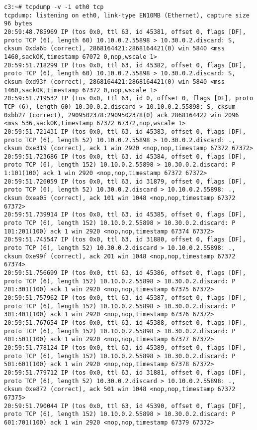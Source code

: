 \documentclass[a4paper,12pt]{article}
\begin{document}
\begin{lstlisting}
c3:~# tcpdump -v -i eth0 tcp
tcpdump: listening on eth0, link-type EN10MB (Ethernet), capture size 96 bytes
20:59:48.785969 IP (tos 0x0, ttl 63, id 45381, offset 0, flags [DF], proto TCP (6), length 60) 10.10.0.2.55898 > 10.30.0.2.discard: S, cksum 0xda6b (correct), 2868164421:2868164421(0) win 5840 <mss 1460,sackOK,timestamp 67072 0,nop,wscale 1>
20:59:51.718299 IP (tos 0x0, ttl 63, id 45382, offset 0, flags [DF], proto TCP (6), length 60) 10.10.0.2.55898 > 10.30.0.2.discard: S, cksum 0xd93f (correct), 2868164421:2868164421(0) win 5840 <mss 1460,sackOK,timestamp 67372 0,nop,wscale 1>
20:59:51.719532 IP (tos 0x0, ttl 63, id 0, offset 0, flags [DF], proto TCP (6), length 60) 10.30.0.2.discard > 10.10.0.2.55898: S, cksum 0xbb27 (correct), 2909502378:2909502378(0) ack 2868164422 win 2096 <mss 536,sackOK,timestamp 67372 67372,nop,wscale 1>
20:59:51.721431 IP (tos 0x0, ttl 63, id 45383, offset 0, flags [DF], proto TCP (6), length 52) 10.10.0.2.55898 > 10.30.0.2.discard: ., cksum 0xe319 (correct), ack 1 win 2920 <nop,nop,timestamp 67372 67372>
20:59:51.723686 IP (tos 0x0, ttl 63, id 45384, offset 0, flags [DF], proto TCP (6), length 152) 10.10.0.2.55898 > 10.30.0.2.discard: P 1:101(100) ack 1 win 2920 <nop,nop,timestamp 67372 67372>
20:59:51.726059 IP (tos 0x0, ttl 63, id 31879, offset 0, flags [DF], proto TCP (6), length 52) 10.30.0.2.discard > 10.10.0.2.55898: ., cksum 0xea05 (correct), ack 101 win 1048 <nop,nop,timestamp 67372 67372>
20:59:51.739914 IP (tos 0x0, ttl 63, id 45385, offset 0, flags [DF], proto TCP (6), length 152) 10.10.0.2.55898 > 10.30.0.2.discard: P 101:201(100) ack 1 win 2920 <nop,nop,timestamp 67374 67372>
20:59:51.745547 IP (tos 0x0, ttl 63, id 31880, offset 0, flags [DF], proto TCP (6), length 52) 10.30.0.2.discard > 10.10.0.2.55898: ., cksum 0xe99f (correct), ack 201 win 1048 <nop,nop,timestamp 67372 67374>
20:59:51.756699 IP (tos 0x0, ttl 63, id 45386, offset 0, flags [DF], proto TCP (6), length 152) 10.10.0.2.55898 > 10.30.0.2.discard: P 201:301(100) ack 1 win 2920 <nop,nop,timestamp 67375 67372>
20:59:51.757962 IP (tos 0x0, ttl 63, id 45387, offset 0, flags [DF], proto TCP (6), length 152) 10.10.0.2.55898 > 10.30.0.2.discard: P 301:401(100) ack 1 win 2920 <nop,nop,timestamp 67376 67372>
20:59:51.767654 IP (tos 0x0, ttl 63, id 45388, offset 0, flags [DF], proto TCP (6), length 152) 10.10.0.2.55898 > 10.30.0.2.discard: P 401:501(100) ack 1 win 2920 <nop,nop,timestamp 67377 67372>
20:59:51.778124 IP (tos 0x0, ttl 63, id 45389, offset 0, flags [DF], proto TCP (6), length 152) 10.10.0.2.55898 > 10.30.0.2.discard: P 501:601(100) ack 1 win 2920 <nop,nop,timestamp 67378 67372>
20:59:51.779712 IP (tos 0x0, ttl 63, id 31881, offset 0, flags [DF], proto TCP (6), length 52) 10.30.0.2.discard > 10.10.0.2.55898: ., cksum 0xe872 (correct), ack 501 win 1048 <nop,nop,timestamp 67372 67375>
20:59:51.790044 IP (tos 0x0, ttl 63, id 45390, offset 0, flags [DF], proto TCP (6), length 152) 10.10.0.2.55898 > 10.30.0.2.discard: P 601:701(100) ack 1 win 2920 <nop,nop,timestamp 67379 67372>


\end{lstlisting}
\end{document}
